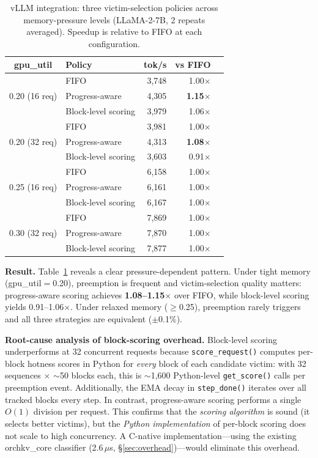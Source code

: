 \documentclass[conference]{IEEEtran}
\begin{document}
\begin{table}[t]
\centering
\caption{vLLM integration: three victim-selection policies across memory-pressure levels (LLaMA-2-7B, 2 repeats averaged). Speedup is relative to FIFO at each configuration.}
\label{tab:vllm-block}
\small
\begin{tabular}{@{}clrrr@{}}
\toprule
gpu\_util & Policy & tok/s & vs FIFO \\
\midrule
\multirow{3}{*}{0.20 (16 req)}
  & FIFO              & 3{,}748 & 1.00$\times$ \\
  & Progress-aware     & 4{,}305 & \textbf{1.15$\times$} \\
  & Block-level scoring & 3{,}979 & 1.06$\times$ \\
\midrule
\multirow{3}{*}{0.20 (32 req)}
  & FIFO              & 3{,}981 & 1.00$\times$ \\
  & Progress-aware     & 4{,}313 & \textbf{1.08$\times$} \\
  & Block-level scoring & 3{,}603 & 0.91$\times$ \\
\midrule
\multirow{3}{*}{0.25 (16 req)}
  & FIFO              & 6{,}158 & 1.00$\times$ \\
  & Progress-aware     & 6{,}161 & 1.00$\times$ \\
  & Block-level scoring & 6{,}167 & 1.00$\times$ \\
\midrule
\multirow{3}{*}{0.30 (32 req)}
  & FIFO              & 7{,}869 & 1.00$\times$ \\
  & Progress-aware     & 7{,}870 & 1.00$\times$ \\
  & Block-level scoring & 7{,}877 & 1.00$\times$ \\
\bottomrule
\end{tabular}
\end{table}

\textbf{Result.} Table~\ref{tab:vllm-block} reveals a clear pressure-dependent pattern. Under tight memory (gpu\_util$=$0.20), preemption is frequent and victim-selection quality matters: progress-aware scoring achieves \textbf{1.08--1.15$\times$} over FIFO, while block-level scoring yields 0.91--1.06$\times$. Under relaxed memory ($\geq$0.25), preemption rarely triggers and all three strategies are equivalent ($\pm$0.1\%).

\textbf{Root-cause analysis of block-scoring overhead.} Block-level scoring underperforms at 32 concurrent requests because \texttt{score\_request()} computes per-block hotness scores in Python for \emph{every} block of each candidate victim: with 32 sequences $\times$ ${\sim}$50 blocks each, this is ${\sim}$1,600 Python-level \texttt{get\_score()} calls per preemption event. Additionally, the EMA decay in \texttt{step\_done()} iterates over all tracked blocks every step. In contrast, progress-aware scoring performs a single $O(1)$ division per request. This confirms that the \emph{scoring algorithm} is sound (it selects better victims), but the \emph{Python implementation} of per-block scoring does not scale to high concurrency. A C-native implementation---using the existing orchkv\_core classifier (2.6\,$\mu$s, \S\ref{sec:overhead})---would eliminate this overhead.
\end{document}

